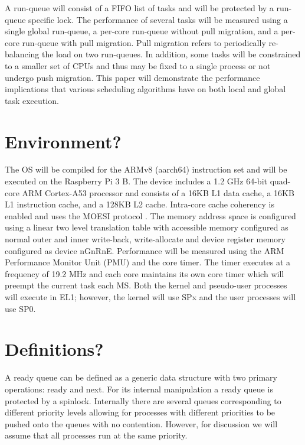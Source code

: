 \documentclass[11pt, twocolumn]{proc}
\begin{document}
A run-queue will consist of a FIFO list of tasks and will be protected by a run-queue specific lock.  The performance of several tasks will be measured using a single global run-queue, a per-core run-queue without pull migration, and a per-core run-queue with pull migration.  Pull migration refers to periodically re-balancing the load on two run-queues.  In addition, some tasks will be constrained to a smaller set of CPUs and thus may be fixed to a single process or not undergo push migration.  This paper will demonstrate the performance implications that various scheduling algorithms have on both local and global task execution.

\section{Environment?}
\label{sec:environment?}
The OS will be compiled for the ARMv8 (aarch64) instruction set and will be executed on the Raspberry Pi 3 B.  The device includes a 1.2 GHz 64-bit quad-core ARM Cortex-A53 processor and consists of a 16KB L1 data cache, a 16KB L1 instruction cache, and a 128KB L2 cache.  Intra-core cache coherency is enabled and uses the MOESI protocol \cite{arm-dcache-coherency}.  The memory address space is configured using a linear two level translation table with accessible memory configured as normal outer and inner write-back, write-allocate and device register memory configured as device nGnRnE.  Performance will be measured using the ARM Performance Monitor Unit (PMU) and the core timer.  The timer executes at a frequency of 19.2 MHz \cite{bcm2386} and each core maintains its own core timer which will preempt the current task each MS.  Both the kernel and pseudo-user processes will execute in EL1; however, the kernel will use SPx and the user processes will use SP0.

\section{Definitions?}
\label{sec:definitions?}

A ready queue can be defined as a generic data structure with two primary operations: ready and next.  For its internal manipulation a ready queue is protected by a spinlock.  Internally there are several queues corresponding to different priority levels allowing for processes with different priorities to be pushed onto the queues with no contention.  However, for discussion we will assume that all processes run at the same priority.
\end{document}
